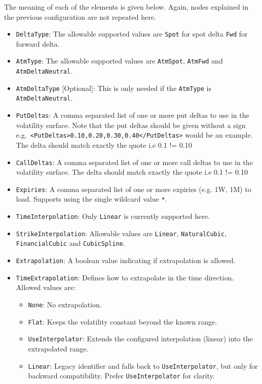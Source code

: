 The meaning of each of the elements is given below. Again, nodes explained in the previous configuration are not repeated here.
\begin{itemize}
\item \lstinline!DeltaType!:
The allowable supported values are \lstinline!Spot! for spot delta \lstinline!Fwd! for forward delta.

\item \lstinline!AtmType!:
The allowable supported values are \lstinline!AtmSpot!, \lstinline!AtmFwd! and \lstinline!AtmDeltaNeutral!.

\item \lstinline!AtmDeltaType! [Optional]:
This is only needed if the \lstinline!AtmType! is \lstinline!AtmDeltaNeutral!.

\item \lstinline!PutDeltas!:
A comma separated list of one or more put deltas to use in the volatility surface. Note that the put deltas should be given without a sign e.g.\ \lstinline!<PutDeltas>0.10,0.20,0.30,0.40</PutDeltas>! would be an example. The delta should match exactly the quote i.e 0.1 != 0.10

\item \lstinline!CallDeltas!:
A comma separated list of one or more call deltas to use in the volatility surface. The delta should match exactly the quote i.e 0.1 != 0.10

\item \lstinline!Expiries!:
A comma separated list of one or more expiries (e.g. 1W, 1M) to load. Supports using the single wildcard value \lstinline!*!.

\item \lstinline!TimeInterpolation!:
Only \lstinline!Linear! is currently supported here.

\item \lstinline!StrikeInterpolation!:
Allowable values are \lstinline!Linear!, \lstinline!NaturalCubic!, \lstinline!FinancialCubic! and \lstinline!CubicSpline!.

\item \lstinline!Extrapolation!:
A boolean value indicating if extrapolation is allowed.

\item \lstinline!TimeExtrapolation!:
Defines how to extrapolate in the time direction. Allowed values are:
  \begin{itemize}
    \item \lstinline!None!: No extrapolation.
    \item \lstinline!Flat!: Keeps the volatility constant beyond the known range.
    \item \lstinline!UseInterpolator!: Extends the configured interpolation (linear) into the extrapolated range.
    \item \lstinline!Linear!: Legacy identifier and falls back to \lstinline!UseInterpolator!, but only for backward compatibility. Prefer \lstinline!UseInterpolator! for clarity.
  \end{itemize}
  

\end{itemize}
